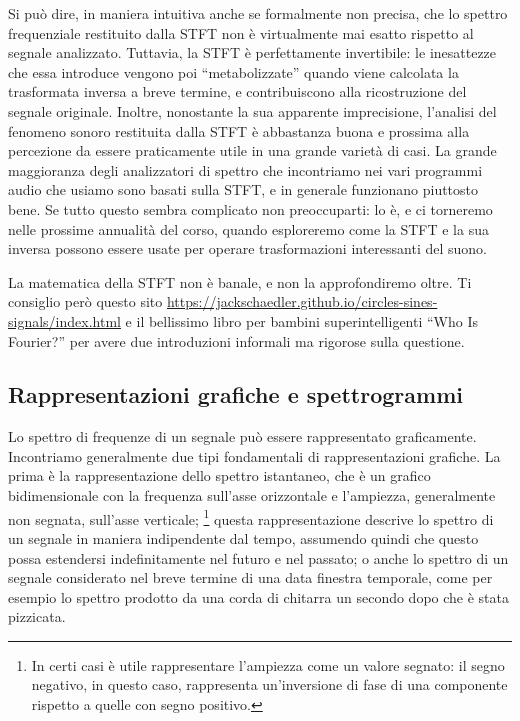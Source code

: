 Si può dire, in maniera intuitiva anche se formalmente non precisa, che lo spettro frequenziale restituito dalla STFT non è virtualmente mai esatto rispetto al segnale analizzato. Tuttavia, la STFT è perfettamente invertibile: le inesattezze che essa introduce vengono poi ``metabolizzate'' quando viene calcolata la trasformata inversa a breve termine, e contribuiscono alla ricostruzione del segnale originale. Inoltre, nonostante la sua apparente imprecisione, l'analisi del fenomeno sonoro restituita dalla STFT è abbastanza buona e prossima alla percezione da essere praticamente utile in una grande varietà di casi. La grande maggioranza degli analizzatori di spettro che incontriamo nei vari programmi audio che usiamo sono basati sulla STFT, e in generale funzionano piuttosto bene. Se tutto questo sembra complicato non preoccuparti: lo è, e ci torneremo nelle prossime annualità del corso, quando esploreremo come la STFT e la sua inversa possono essere usate per operare trasformazioni interessanti del suono.

La matematica della STFT non è banale, e non la approfondiremo oltre. Ti consiglio però questo sito \url{
https://jackschaedler.github.io/circles-sines-signals/index.html} e il bellissimo libro per bambini superintelligenti ``Who Is Fourier?'' per avere due introduzioni informali ma rigorose sulla questione.

\subsection{Rappresentazioni grafiche e spettrogrammi}

Lo spettro di frequenze di un segnale può essere rappresentato graficamente. Incontriamo generalmente due tipi fondamentali di rappresentazioni grafiche. La prima è la rappresentazione dello spettro istantaneo, che è un grafico bidimensionale con la frequenza sull'asse orizzontale e l'ampiezza, generalmente non segnata, sull'asse verticale;%
\footnote{In certi casi è utile rappresentare l'ampiezza come un valore segnato: il segno negativo, in questo caso, rappresenta un'inversione di fase di una componente rispetto a quelle con segno positivo.}
questa rappresentazione descrive lo spettro di un segnale in maniera indipendente dal tempo, assumendo quindi che questo possa estendersi indefinitamente nel futuro e nel passato; o anche lo spettro di un segnale considerato nel breve termine di una data finestra temporale, come per esempio lo spettro prodotto da una corda di chitarra un secondo dopo che è stata pizzicata.

